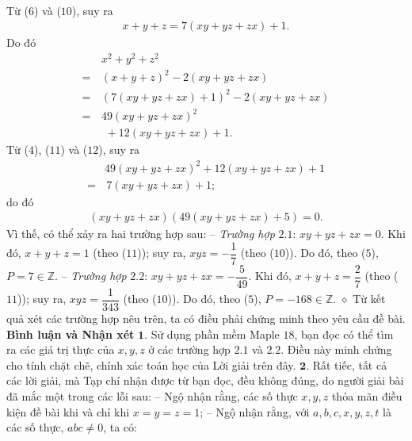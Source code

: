 \begin{multicols}{2}
\begin{align*}
	\end{align*}
	Từ ($6$) và ($10$), suy ra
	\begin{align*}
		x + y + z = 7\left( {xy + yz + zx} \right) + 1. \tag{$11$}
	\end{align*}
	Do đó
	\begin{align*}
		&{x^2} + {y^2} + {z^2} \\
		= \,&{\left( {x + y + z} \right)^2} - 2\left( {xy + yz + zx} \right) \\
		= \,&{\left( {7\left( {xy + yz + zx} \right) + 1} \right)^2} - 2\left( {xy + yz + zx} \right)\\
		= \,&49{\left( {xy + yz + zx} \right)^2}\\
		 &\,\,+ 12\left( {xy + yz + zx} \right) + 1. \tag{$12$}
	\end{align*}
	Từ ($4$), ($11$) và ($12$), suy ra
	\begin{align*}
		&49{\left( {xy + yz + zx} \right)^2} + 12\left( {xy + yz + zx} \right) + 1 \\
		= &\,7\left( {xy + yz + zx} \right) + 1;
	\end{align*}
	do đó
	\begin{align*}
		\left( {xy + yz + zx} \right)\left( {49\left( {xy + yz + zx} \right) + 5} \right) = 0.
	\end{align*}
	Vì thế, có thể xảy ra hai trường hợp sau:
	\vskip 0.05cm
	-- \textit{Trường hợp} $2.1$: $xy + yz + zx = 0$.
	\vskip 0.05cm
	Khi đó, $x + y + z = 1$  (theo ($11$)); suy ra, $xyz = - \dfrac{1}{7}$  (theo ($10$)).
	\vskip 0.05cm
	Do đó, theo ($5$),  $P = 7 \in \mathbb{Z}$.
	\vskip 0.05cm
	-- \textit{Trường hợp} $2.2$: $xy + yz + zx = - \dfrac{5}{49}$.
	\vskip 0.05cm  
	Khi đó, $x + y + z = \dfrac{2}{7}$  (theo ($11$)); suy ra, $xyz = \dfrac{1}{343}$  (theo ($10$)).
	\vskip 0.05cm
	Do đó, theo ($5$),  $P = -168 \in \mathbb{Z}$.
	\vskip 0.05cm
	$\diamond$ Từ kết quả xét các trường hợp nêu trên, ta có điều phải chứng minh theo yêu cầu đề bài.
	\vskip 0.05cm
	\textbf{\color{thachthuctoanhoc}Bình luận và Nhận xét}
	\vskip 0.05cm
	$\pmb{1.}$ Sử dụng phần mềm Maple $18$, bạn đọc có thể tìm ra các giá trị thực của $x, y, z$ ở các trường hợp $2.1$ và $2.2$. Điều này minh chứng cho tính chặt chẽ, chính xác toán học của Lời giải trên đây.
	\vskip 0.05cm
	$\pmb{2.}$ Rất tiếc, tất cả các lời giải, mà Tạp chí nhận được từ bạn đọc, đều không đúng, do người giải bài đã mắc một trong các lỗi sau:
	\vskip 0.05cm
	-- Ngộ nhận rằng, các số thực $x, y, z$ thỏa mãn điều kiện đề bài khi và chỉ khi $x = y = z = 1$;
	\vskip 0.05cm
	-- Ngộ nhận rằng, với $a, b, c, x, y, z, t$ là các số thực, $abc \ne 0$, ta có:

\end{multicols}
